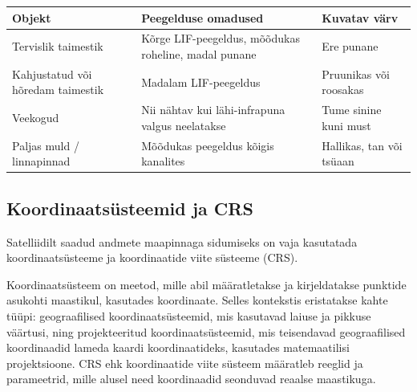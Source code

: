 \begin{table}[H]
\caption{NGR indeksi värvi kasutusjuhend}
\label{tab:NGR_kasutus}
\begin{longtable}{lp{5cm}l}
    \hline
    Objekt & Peegelduse omadused & Kuvatav värv                          \\ 
    \hline
    Tervislik taimestik & Kõrge LIF-peegeldus, mõõdukas roheline, madal punane & Ere punane \\
    Kahjustatud või hõredam taimestik & Madalam LIF-peegeldus & Pruunikas või roosakas \\
    Veekogud & 	Nii nähtav kui lähi-infrapuna valgus neelatakse & Tume sinine kuni must \\
    Paljas muld / linnapinnad & Mõõdukas peegeldus kõigis kanalites & Hallikas, tan või tsüaan\\
    \hline
\end{longtable}
\end{table}
\addtocounter{table}{-1}

\subsection{Koordinaatsüsteemid ja CRS}
Satelliidilt saadud andmete maapinnaga sidumiseks on vaja kasutatada koordinaatsüsteeme ja
koordinaatide viite süsteeme (CRS).

Koordinaatsüsteem on meetod, mille abil määratletakse ja kirjeldatakse punktide
asukohti maastikul, kasutades koordinaate. Selles kontekstis eristatakse kahte
tüüpi: geograafilised koordinaatsüsteemid, mis kasutavad laiuse ja pikkuse
väärtusi, ning projekteeritud koordinaatsüsteemid, mis teisendavad
geograafilised koordinaadid lameda kaardi koordinaatideks, kasutades
matemaatilisi projektsioone. CRS ehk koordinaatide viite süsteem määratleb
reeglid ja parameetrid, mille alusel need koordinaadid seonduvad reaalse
maastikuga. \cite{8CoordinateReference}

